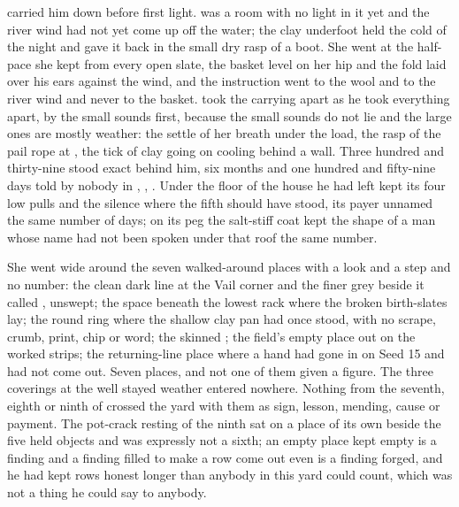  carried him down before first light.  was a room with no light in it yet and the river wind had not yet come up off the water; the clay underfoot held the cold of the night and gave it back in the small dry rasp of a boot. She went at the half-pace she kept from every open slate, the basket level on her hip and the fold laid over his ears against the wind, and the instruction went to the wool and to the river wind and never to the basket.  took the carrying apart as he took everything apart, by the small sounds first, because the small sounds do not lie and the large ones are mostly weather: the settle of her breath under the load, the rasp of the pail rope at , the tick of clay going on cooling behind a wall. Three hundred and thirty-nine stood exact behind him, six months and one hundred and fifty-nine days told by nobody in , , . Under the floor of the house he had left  kept its four low pulls and the silence where the fifth should have stood, its payer unnamed the same number of days; on its peg the salt-stiff coat kept the shape of a man whose name had not been spoken under that roof the same number.

She went wide around the seven walked-around places with a look and a step and no number: the clean dark line at the Vail corner and the finer grey beside it called , unswept; the space beneath the lowest rack where the broken birth-slates lay; the round ring where the shallow clay pan had once stood, with no scrape, crumb, print, chip or word; the skinned ; the field's empty place out on the worked strips; the returning-line place where a hand had gone in on Seed 15 and had not come out. Seven places, and not one of them given a figure. The three coverings at the well stayed weather entered nowhere. Nothing from the seventh, eighth or ninth of  crossed the yard with them as sign, lesson, mending, cause or payment. The pot-crack resting of the ninth sat on a place of its own beside the five held objects and was expressly not a sixth; an empty place kept empty is a finding and a finding filled to make a row come out even is a finding forged, and he had kept rows honest longer than anybody in this yard could count, which was not a thing he could say to anybody.

